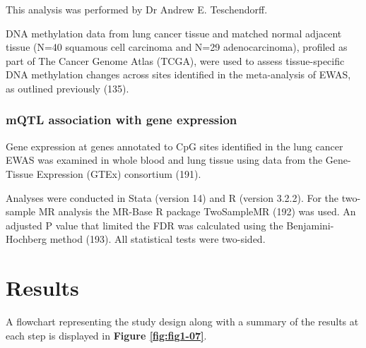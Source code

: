 \documentclass[11pt,oneside]{bristolthesis}
\begin{document}
This analysis was performed by Dr Andrew E. Teschendorff.

DNA methylation data from lung cancer tissue and matched normal adjacent tissue (N=40 squamous cell carcinoma and N=29 adenocarcinoma), profiled as part of The Cancer Genome Atlas (TCGA), were used to assess tissue-specific DNA methylation changes across sites identified in the meta-analysis of EWAS, as outlined previously (135).

\hypertarget{mqtl-association-with-gene-expression}{%
\subsubsection{mQTL association with gene expression}\label{mqtl-association-with-gene-expression}}

Gene expression at genes annotated to CpG sites identified in the lung cancer EWAS was examined in whole blood and lung tissue using data from the Gene-Tissue Expression (GTEx) consortium (191).

Analyses were conducted in Stata (version 14) and R (version 3.2.2). For the two-sample MR analysis the MR-Base R package TwoSampleMR (192) was used. An adjusted P value that limited the FDR was calculated using the Benjamini-Hochberg method (193). All statistical tests were two-sided.

\hypertarget{results-07}{%
\section{Results}\label{results-07}}

A flowchart representing the study design along with a summary of the results at each step is displayed in \textbf{Figure \ref{fig:fig1-07}}.
\end{document}
